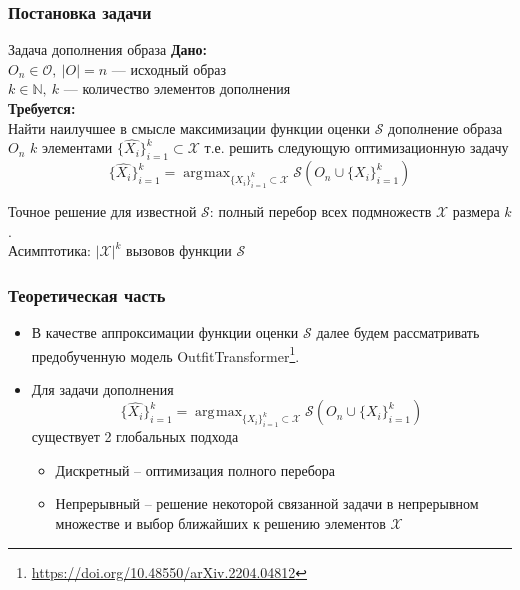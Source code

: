 \documentclass[10pt]{beamer}
\DeclareMathOperator*{\argmax}{\arg\!\max}
\begin{document}
\begin{frame}
	\frametitle{Постановка задачи}
	\begin{block}{Задача дополнения образа}
			\textbf{Дано:}\\
			$O_n\in\mathcal{O}, ~|O| = n$ --- исходный образ \\
			$k \in \mathbb{N}, ~k$ --- количество элементов дополнения \\	
			
			\textbf{Требуется:}\\
			Найти наилучшее в смысле максимизации функции оценки $\mathcal{S}$ дополнение образа $O_n$  $k$ элементами $\{\hat{X_i}\}_{i=1}^k\subset \mathcal{X}$ т.е. решить следующую оптимизационную задачу
			$$\{\hat{X_i}\}_{i=1}^k= \argmax_{\{X_i\}_{i=1}^k\subset\mathcal{X}} \mathcal{S}\left(O_n\cup\{X_i\}_{i=1}^k\right)$$
			
			Точное решение для известной $\mathcal{S}$: полный перебор всех подмножеств $\mathcal{X}$ размера $k$.\\
			Асимптотика: $|\mathcal{X}|^k$ вызовов функции $\mathcal{S}$
	\end{block}					
\end{frame}


\begin{frame}
	\frametitle{Теоретическая часть}
	\begin{itemize}	
	 	\item В качестве аппроксимации функции оценки $\mathcal{S}$ далее будем рассматривать предобученную модель OutfitTransformer\footnote{\url{https://doi.org/10.48550/arXiv.2204.04812}}.
	    \item Для задачи дополнения 
	    $$\{\hat{X_i}\}_{i=1}^k= \argmax_{\{X_i\}_{i=1}^k\subset\mathcal{X}} \mathcal{S}\left(O_n\cup\{X_i\}_{i=1}^k\right)$$
	    существует 2 глобальных подхода 
	    \begin{itemize}	
	    	\item Дискретный -- оптимизация полного перебора
	    	\item Непрерывный -- решение некоторой связанной задачи в непрерывном множестве и выбор ближайших к решению элементов $\mathcal{X}$
	    \end{itemize}
	   \end{itemize}
\end{frame}
\end{document}

